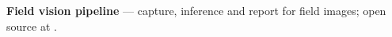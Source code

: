 \item \textbf{Field vision pipeline} — capture, inference and report for field images; open source at \cvcode.
